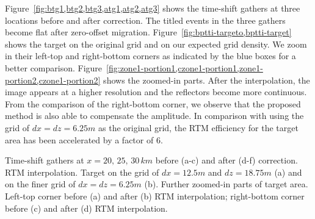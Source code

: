 Figure~\ref{fig:btg1,btg2,btg3,atg1,atg2,atg3} shows the time-shift gathers at three locations before and after correction.
The titled events in the three gathers become flat after zero-offset migration.
Figure~\ref{fig:bptti-targeto,bptti-target} shows the target on the original grid and on our expected grid density.
We zoom in their left-top and right-bottom corners as indicated by the blue boxes for a better comparison.
Figure~\ref{fig:zone1-portion1,czone1-portion1,zone1-portion2,czone1-portion2} shows the zoomed-in parts.
After the interpolation, the image appears at a higher resolution and the reflectors become more continuous.
From the comparison of the right-bottom corner, we observe that the proposed method is also able to compensate the amplitude.
In comparison with using the grid of $dx=dz=6.25m$ as the original grid, the RTM efficiency for the target
area has been accelerated by a factor of 6.

{Time-shift gathers at $x=20,\,25,\,30\,km$ before (a-c) and after (d-f) correction.}
{RTM interpolation. Target on the grid of $dx=12.5m$ and $dz=18.75m$ (a) and on the finer grid of $dx=dz=6.25m$ (b).}
{Further zoomed-in parts of target area. Left-top corner before (a) and after (b) RTM interpolation; 
right-bottom corner before (c) and after (d) RTM interpolation.}
